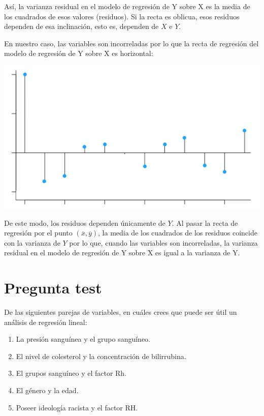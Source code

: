 \documentclass[
]{book}
\providecommand{\tightlist}{%
  \setlength{\itemsep}{0pt}\setlength{\parskip}{0pt}}
\begin{document}
Así, la varianza residual en el modelo de regresión de Y sobre X es la media de los cuadrados de esos valores (residuos). Si la recta es oblicua, esos residuos dependen de esa inclinación, esto es, dependen de \(X\) e \(Y\).

En nuestro caso, las variables son incorreladas por lo que la recta de regresión del modelo de regresión de Y sobre X es horizontal:

\includegraphics[width=15.42in]{img/4_3}

De este modo, los residuos dependen únicamente de \(Y\). Al pasar la recta de regresión por el punto \((\overline{x}, \overline{y})\), la media de los cuadrados de los residuos coincide con la varianza de \(Y\) por lo que, cuando las variables son incorreladas, la varianza residual en el modelo de regresión de Y sobre X es igual a la varianza de Y.

\hypertarget{pregunta-test-125}{%
\section{Pregunta test}\label{pregunta-test-125}}

De las siguientes parejas de variables, en cuáles crees que puede ser útil un análisis de regresión lineal:

\begin{enumerate}
\def\labelenumi{\alph{enumi})}
\tightlist
\item
  La presión sanguínea y el grupo sanguíneo.
\item
  El nivel de colesterol y la concentración de bilirrubina.
\item
  El grupos sanguíneo y el factor Rh.
\item
  El género y la edad.
\item
  Poseer ideología racista y el factor RH.
\end{enumerate}
\end{document}
